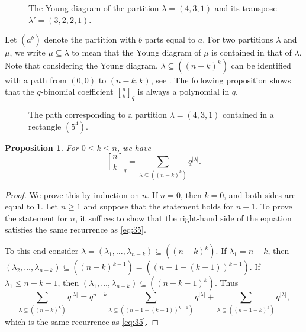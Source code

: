 \documentclass[oneside]{book}
\numberwithin{equation}{section}
\newtheorem{prop}[thm]{Proposition}
\theoremstyle{definition}
\newcommand\Qbinom[3]{\genfrac{[}{]}{0pt}{}{#1}{#2}_{#3}}
\newcommand\qbinom[2]{\Qbinom{#1}{#2}{q}}
\begin{document}
\begin{figure}
  \centering
{} \qquad\qquad  \qquad 
{}
\caption{The Young diagram of the partition \( \lambda=(4,3,1) \)
  and its transpose \( \lambda' = (3,2,2,1) \).}
  \label{fig:8}
\end{figure}

Let \( (a^b) \) denote the partition with \( b \) parts equal to
\( a \). For two partitions \( \lambda \) and \( \mu \), we write
\( \mu\subseteq\lambda \) to mean that the Young diagram of \( \mu \)
is contained in that of \( \lambda \). Note that considering the Young
diagram, \( \lambda\subseteq((n-k)^{k}) \) can be identified with a
path from \( (0,0) \) to \( (n-k,k) \), see . The
following proposition shows that the \( q \)-binomial coefficient
\( \qbinom{n}{k} \) is always a polynomial in \( q \).

\begin{figure}
  \centering
{}
\caption{The path corresponding to a partition \( \lambda=(4,3,1) \)
contained in a rectangle \( (5^4) \).}
  \label{fig:9}
\end{figure}


\begin{prop}
  For \( 0\le k\le n \), we have
\begin{equation}\label{eq:36}
  \qbinom{n}{k} = \sum_{\lambda\subseteq((n-k)^k)} q^{|\lambda|}.
\end{equation}
\end{prop}

\begin{proof}
  We prove this by induction on \( n \). If \( n=0 \), then \( k=0 \),
  and both sides are equal to \( 1 \). Let \( n\ge1 \) and suppose
  that the statement holds for \( n-1 \). To prove the statement for
  \( n \), it suffices to show that the right-hand side of the
  equation satisfies the same recurrence as \eqref{eq:35}.

  To this end consider
  \( \lambda=(\lambda_1,\dots,\lambda_{n-k}) \subseteq ((n-k)^k) \).
  If \( \lambda_1 =n-k \), then
  \( (\lambda_2,\dots,\lambda_{n-k}) \subseteq ((n-k)^{k-1}) = ((n-1-(k-1))^{k-1}) \). If
  \( \lambda_1 \le n-k-1 \), then
  \( (\lambda_1,\dots,\lambda_{n-k}) \subseteq ((n-k-1)^{k}) \).
  Thus
  \[
    \sum_{\lambda\subseteq((n-k)^k)} q^{|\lambda|}
    = q^{n-k}\sum_{\lambda\subseteq((n-1-(k-1))^{k-1})} q^{|\lambda|}
    + \sum_{\lambda\subseteq((n-1-k)^k)} q^{|\lambda|},
  \]
  which is the same recurrence as \eqref{eq:35}.
\end{proof}
\end{document}
